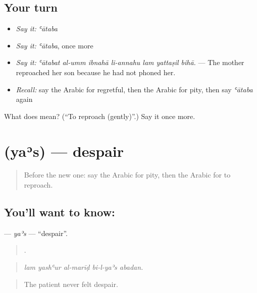 \subsection*{Your turn}
\begin{itemize}
\raggedright
  \item \emph{Say it:} \emph{ʿātaba}
  \item \emph{Say it:} \emph{ʿātaba}, once more
  \item \emph{Say it:} \emph{ʿātabat al-umm ibnahā li-annahu lam yattaṣil bihā.} — The mother reproached her son because he had not phoned her.
  \item \emph{Recall:} say the Arabic for regretful, then the Arabic for pity, then say \emph{ʿātaba} again
\end{itemize}

\begin{tcolorbox}[breakable,colback=teal!4,colframe=teal!35!black,title={Before you move on}]
What does  mean? (\textquotedblleft{}To reproach (gently)\textquotedblright{}.) Say it once more.
\end{tcolorbox}
\section[\texorpdfstring{\ar{يأس} (yaʾs)}{يأس (yaʾs)}]{ (yaʾs) — despair}

\label{lesson:AR-C493-yas}



\begin{quote}
Before the new one: say the Arabic for pity, then the Arabic for to reproach.
\end{quote}

\subsection*{You'll want to know: }
\textbf{} — \emph{yaʾs} — \textquotedblleft{}despair\textquotedblright{}.

\begin{quote}
    .
\end{quote}

\begin{quote}
\emph{lam yashʿur al-marīḍ bi-l-yaʾs abadan.}
\end{quote}

\begin{quote}
The patient never felt despair.
\end{quote}

